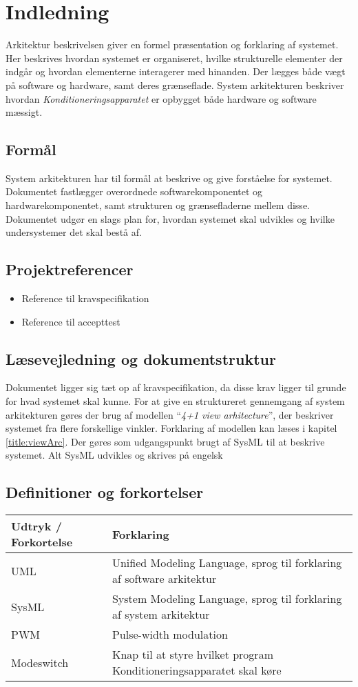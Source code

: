 	\chapter{Indledning}
	Arkitektur beskrivelsen giver en formel præsentation og forklaring af systemet. Her beskrives hvordan systemet er organiseret, hvilke strukturelle elementer der indgår og hvordan elementerne interagerer med hinanden. Der lægges både vægt på software og hardware, samt deres grænseflade. System arkitekturen beskriver hvordan \textit{Konditioneringsapparatet} er opbygget både hardware og software mæssigt.
	
	\section{Formål}
	System arkitekturen har til formål at beskrive og give forståelse for systemet. Dokumentet fastlægger overordnede softwarekomponentet og hardwarekomponentet, samt strukturen og grænsefladerne mellem disse. Dokumentet udgør en slags plan for, hvordan systemet skal udvikles og hvilke undersystemer det skal bestå af. 
	
	\section{Projektreferencer}
	\begin{itemize}
		\item Reference til kravspecifikation
		\item Reference til accepttest
	\end{itemize}
	
	\section{Læsevejledning og dokumentstruktur}
	Dokumentet ligger sig tæt op af kravspecifikation, da disse krav ligger til grunde for hvad systemet skal kunne. For at give en struktureret gennemgang af system arkitekturen gøres der brug af modellen “\textit{4+1 view arhitecture}”, der beskriver systemet fra flere forskellige vinkler. Forklaring af modellen kan læses i kapitel \ref{title:viewArc}. Der gøres som udgangspunkt brugt af SysML til at beskrive systemet. Alt SysML udvikles og skrives på engelsk

	\section{Definitioner og forkortelser}
	\begin{longtable}{ |p{} |p{}| } 
		\hline
		\textbf{Udtryk / Forkortelse} &  \textbf{Forklaring} \\
		\hline
		UML & Unified Modeling Language, sprog til forklaring af software arkitektur \\
		\hline
		SysML & System Modeling Language, sprog til forklaring af system arkitektur \\
		\hline
		PWM & Pulse-width modulation \\
		\hline
		Modeswitch & Knap til at styre hvilket program Konditioneringsapparatet skal køre \\
		\hline
	\end{longtable}